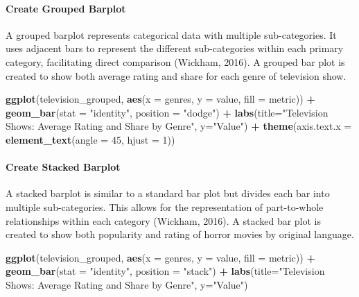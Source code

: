 \documentclass[
]{book}
\newenvironment{Shaded}{\begin{snugshade}}{\end{snugshade}}
\newcommand{\AttributeTok}[1]{\textcolor[rgb]{0.13,0.29,0.53}{#1}}
\newcommand{\DecValTok}[1]{\textcolor[rgb]{0.00,0.00,0.81}{#1}}
\newcommand{\FunctionTok}[1]{\textcolor[rgb]{0.13,0.29,0.53}{\textbf{#1}}}
\newcommand{\NormalTok}[1]{#1}
\newcommand{\SpecialCharTok}[1]{\textcolor[rgb]{0.81,0.36,0.00}{\textbf{#1}}}
\newcommand{\StringTok}[1]{\textcolor[rgb]{0.31,0.60,0.02}{#1}}
\begin{document}
\hypertarget{create-grouped-barplot}{%
\paragraph*{Create Grouped Barplot}\label{create-grouped-barplot}}

A grouped barplot represents categorical data with multiple sub-categories. It uses adjacent bars to represent the different sub-categories within each primary category, facilitating direct comparison (Wickham, 2016). A grouped bar plot is created to show both average rating and share for each genre of television show.

\begin{Shaded}
\begin{Highlighting}[]
\FunctionTok{ggplot}\NormalTok{(television\_grouped, }\FunctionTok{aes}\NormalTok{(}\AttributeTok{x =}\NormalTok{ genres, }\AttributeTok{y =}\NormalTok{ value, }\AttributeTok{fill =}\NormalTok{ metric)) }\SpecialCharTok{+}
  \FunctionTok{geom\_bar}\NormalTok{(}\AttributeTok{stat =} \StringTok{"identity"}\NormalTok{, }\AttributeTok{position =} \StringTok{"dodge"}\NormalTok{) }\SpecialCharTok{+}
  \FunctionTok{labs}\NormalTok{(}\AttributeTok{title=}\StringTok{"Television Shows: Average Rating and Share by Genre"}\NormalTok{, }\AttributeTok{y=}\StringTok{"Value"}\NormalTok{) }\SpecialCharTok{+}
  \FunctionTok{theme}\NormalTok{(}\AttributeTok{axis.text.x =} \FunctionTok{element\_text}\NormalTok{(}\AttributeTok{angle =} \DecValTok{45}\NormalTok{, }\AttributeTok{hjust =} \DecValTok{1}\NormalTok{))}
\end{Highlighting}
\end{Shaded}

\hypertarget{create-stacked-barplot}{%
\paragraph*{Create Stacked Barplot}\label{create-stacked-barplot}}

A stacked barplot is similar to a standard bar plot but divides each bar into multiple sub-categories. This allows for the representation of part-to-whole relationships within each category (Wickham, 2016). A stacked bar plot is created to show both popularity and rating of horror movies by original language.

\begin{Shaded}
\begin{Highlighting}[]
\FunctionTok{ggplot}\NormalTok{(television\_grouped, }\FunctionTok{aes}\NormalTok{(}\AttributeTok{x =}\NormalTok{ genres, }\AttributeTok{y =}\NormalTok{ value, }\AttributeTok{fill =}\NormalTok{ metric)) }\SpecialCharTok{+}
  \FunctionTok{geom\_bar}\NormalTok{(}\AttributeTok{stat =} \StringTok{"identity"}\NormalTok{, }\AttributeTok{position =} \StringTok{"stack"}\NormalTok{) }\SpecialCharTok{+}
  \FunctionTok{labs}\NormalTok{(}\AttributeTok{title=}\StringTok{"Television Shows: Average Rating and Share by Genre"}\NormalTok{, }\AttributeTok{y=}\StringTok{"Value"}\NormalTok{) }
\end{Highlighting}
\end{Shaded}
\end{document}
